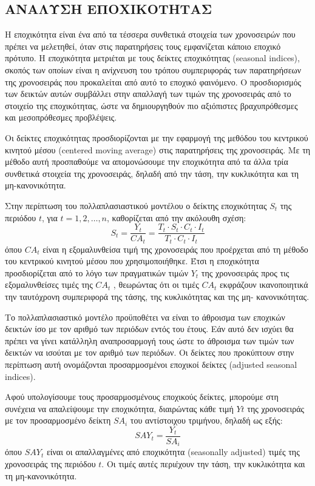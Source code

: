 \subsection{ΑΝΑΛΥΣΗ ΕΠΟΧΙΚΟΤΗΤΑΣ }
Η εποχικότητα είναι ένα από τα τέσσερα συνθετικά στοιχεία των χρονοσειρών
που πρέπει να μελετηθεί, όταν στις παρατηρήσεις τους εμφανίζεται κάποιο εποχικό
πρότυπο. Η εποχικότητα μετριέται με τους δείκτες εποχικότητας (seasonal indices),
σκοπός των οποίων είναι η ανίχνευση του τρόπου συμπεριφοράς των παρατηρήσεων
της χρονοσειράς που προκαλείται από αυτό το εποχικό φαινόμενο. Ο προσδιορισμός
των δεικτών αυτών συμβάλλει στην απαλλαγή των τιμών της χρονοσειράς από το
στοιχείο της εποχικότητας, ώστε να δημιουργηθούν πιο αξιόπιστες βραχυπρόθεσμες
και μεσοπρόθεσμες προβλέψεις.

Οι δείκτες εποχικότητας προσδιορίζονται με την εφαρμογή της μεθόδου του
κεντρικού κινητού μέσου (centered moving average) στις παρατηρήσεις της
χρονοσειράς. Με τη μέθοδο αυτή προσπαθούμε να απομονώσουμε την εποχικότητα
από τα άλλα τρία συνθετικά στοιχεία της χρονοσειράς, δηλαδή από την τάση, την
κυκλικότητα και τη μη-κανονικότητα.

Στην περίπτωση του πολλαπλασιαστικού μοντέλου ο δείκτης εποχικότητας $S_t$ της
περιόδου $t$, για $t = 1, 2,\ldots, n$, καθορίζεται από την ακόλουθη σχέση:
$$ S_t=\frac{Y_t}{CA_t}=\frac{T_t\cdot S_t \cdot C_t \cdot I_t}{T_t \cdot C_t \cdot I_t} $$
όπου $CA_t$ είναι η εξομαλυνθείσα τιμή της χρονοσειράς που προέρχεται από τη μέθοδο
του κεντρικού κινητού μέσου που χρησιμοποιήθηκε. Έτσι η εποχικότητα
προσδιορίζεται από το λόγο των πραγματικών τιμών $Y_t$ της χρονοσειράς προς τις
εξομαλυνθείσες τιμές της $CA_t$ , θεωρώντας ότι οι τιμές $CA_t$ εκφράζουν ικανοποιητικά
την ταυτόχρονη συμπεριφορά της τάσης, της κυκλικότητας και της μη-
κανονικότητας.

Το πολλαπλασιαστικό μοντέλο προϋποθέτει να είναι το άθροισμα των εποχικών
δεικτών ίσο με τον αριθμό των περιόδων εντός του έτους. Εάν αυτό δεν ισχύει θα
πρέπει να γίνει κατάλληλη αναπροσαρμογή τους ώστε το άθροισμα των τιμών των
δεικτών να ισούται με τον αριθμό των περιόδων. Οι δείκτες που προκύπτουν στην
περίπτωση αυτή ονομάζονται προσαρμοσμένοι εποχικοί δείκτες (adjusted seasonal
indices).

Αφού υπολογίσουμε τους προσαρμοσμένους εποχικούς δείκτες, μπορούμε στη
συνέχεια να απαλείψουμε την εποχικότητα, διαιρώντας κάθε τιμή $Y t$ της χρονοσειράς
με τον προσαρμοσμένο δείκτη $SA_i$ του αντίστοιχου τριμήνου, δηλαδή ως εξής:\\
$$ SAY_t=\frac{Y_t}{SA_i} $$
όπου $SAY_t$ είναι οι απαλλαγμένες από εποχικότητα (seasonally adjusted) τιμές της
χρονοσειράς της περιόδου $t$. Οι τιμές αυτές περιέχουν την τάση, την κυκλικότητα και
τη μη-κανονικότητα.
